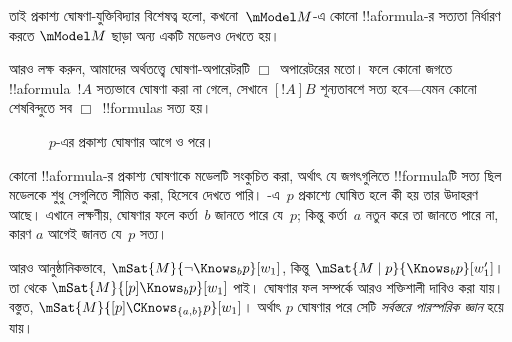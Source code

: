 \documentclass[../../../include/open-logic-section]{subfiles}
\begin{document}
\begin{defn}
\begin{enumerate}
  \end{enumerate}
\end{defn}

তাই প্রকাশ্য ঘোষণা-যুক্তিবিদ্যার বিশেষত্ব হলো, কখনো~$\mModel M$-এ কোনো !!a{formula}-র সত্যতা নির্ধারণ করতে $\mModel M$ ছাড়া অন্য একটি মডেলও দেখতে হয়।

আরও লক্ষ করুন, আমাদের অর্থতত্ত্বে ঘোষণা-অপারেটরটি $\Box$~অপারেটরের মতো। ফলে কোনো জগতে !!a{formula}~$!A$ সত্যভাবে ঘোষণা করা না গেলে, সেখানে $[!A]B$ শূন্যতাবশে সত্য হবে—যেমন কোনো শেষবিন্দুতে সব $\Box$~!!{formula}s সত্য হয়।

\begin{figure}
  \begin{center}
  \end{center}
  \caption{$p$-এর প্রকাশ্য ঘোষণার আগে ও পরে।}
\end{figure}

কোনো !!a{formula}-র প্রকাশ্য ঘোষণাকে মডেলটি সংকুচিত করা, অর্থাৎ যে জগৎগুলিতে !!{formula}টি সত্য ছিল মডেলকে শুধু সেগুলিতে সীমিত করা, হিসেবে দেখতে পারি। -এ~$p$ প্রকাশ্যে ঘোষিত হলে কী হয় তার উদাহরণ আছে। এখানে লক্ষণীয়, ঘোষণার ফলে কর্তা~$b$ জানতে পারে যে~$p$; কিন্তু কর্তা~$a$ নতুন করে তা জানতে পারে না, কারণ $a$ আগেই জানত যে~$p$ সত্য।

আরও আনুষ্ঠানিকভাবে, $\mSat{M}{\lnot \Knows_b p}[w_1]$, কিন্তু $\mSat{M
\mid p}{\Knows_b p}[w'_1]$। তা থেকে $\mSat{M}{[p] \Knows_b
p}[w_1]$ পাই। ঘোষণার ফল সম্পর্কে আরও শক্তিশালী দাবিও করা যায়। বস্তুত,
$\mSat{M}{[p]\CKnows_{\{a,b\}} p}[w_1]$। অর্থাৎ $p$ ঘোষণার পরে সেটি \emph{সর্বস্তরে পারস্পরিক জ্ঞান} হয়ে যায়।
\end{document}
